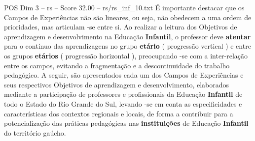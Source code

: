 \begin{textsample}{POS Dim 3 – rs – Score 32.00 – rs/rs\_inf\_10.txt}
É importante destacar que os Campos de Experiências não são lineares, ou seja, não obedecem a uma ordem de prioridades, mas articulam -se entre si.
Ao realizar a leitura dos Objetivos de aprendizagem e desenvolvimento na Educação \textbf{Infantil}, o professor deve \textbf{atentar} para o contínuo das aprendizagens no grupo \textbf{etário} ( progressão vertical ) e entre os grupos \textbf{etários} ( progressão horizontal ), preocupando -se com a inter-relação entre os campos, evitando a fragmentação e a descontinuidade do trabalho pedagógico.
A seguir, são apresentados cada um dos Campos de Experiências e seus respectivos Objetivos de aprendizagem e desenvolvimento, elaborados mediante a participação de professores e profissionais da Educação \textbf{Infantil} de todo o Estado do Rio Grande do Sul, levando -se em conta as especificidades e características dos contextos regionais e locais, de forma a contribuir para a potencialização das práticas pedagógicas nas \textbf{instituições} de Educação \textbf{Infantil} do território gaúcho.

\end{textsample}
